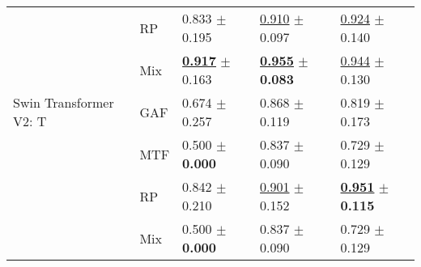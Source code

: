 \begin{tabular}{lllll}
 & RP & \textcolor[rgb]{0.2000000000,0.5000000000,0}{0.833} $\pm$ \textcolor[rgb]{0.7562290965,0.2437709035,0}{0.195} & \underline{\textcolor[rgb]{0.3607594937,0.5000000000,0}{0.910}} $\pm$ \textcolor[rgb]{0.1966386376,0.5000000000,0}{0.097} & \underline{\textcolor[rgb]{0.1250000000,0.5000000000,0}{0.924}} $\pm$ \textcolor[rgb]{0.3653589030,0.5000000000,0}{0.140} \\
 & Mix & \underline{\textbf{\textcolor[rgb]{0.0000000000,0.5000000000,0}{0.917}}} $\pm$ \textcolor[rgb]{0.6327066559,0.3672933441,0}{0.163} & \underline{\textbf{\textcolor[rgb]{0.0000000000,0.5000000000,0}{0.955}}} $\pm$ \textbf{\textcolor[rgb]{0.0000000000,0.5000000000,0}{0.083}} & \underline{\textcolor[rgb]{0.0312500000,0.5000000000,0}{0.944}} $\pm$ \textcolor[rgb]{0.2186313288,0.5000000000,0}{0.130} \\
Swin Transformer V2: T & GAF & \textcolor[rgb]{0.5833333333,0.4166666667,0}{0.674} $\pm$ \textcolor[rgb]{1.0000000000,0.0000000000,0}{0.257} & \textcolor[rgb]{0.6898734177,0.3101265823,0}{0.868} $\pm$ \textcolor[rgb]{0.5237268248,0.4762731752,0}{0.119} & \textcolor[rgb]{0.5937500000,0.4062500000,0}{0.819} $\pm$ \textcolor[rgb]{0.8629057551,0.1370942449,0}{0.173} \\
 & MTF & \textcolor[rgb]{1.0000000000,0.0000000000,0}{0.500} $\pm$ \textbf{\textcolor[rgb]{0.0000000000,0.5000000000,0}{0.000}} & \textcolor[rgb]{0.9367088608,0.0632911392,0}{0.837} $\pm$ \textcolor[rgb]{0.0948745076,0.5000000000,0}{0.090} & \textcolor[rgb]{1.0000000000,0.0000000000,0}{0.729} $\pm$ \textcolor[rgb]{0.2036354899,0.5000000000,0}{0.129} \\
 & RP & \textcolor[rgb]{0.1800000000,0.5000000000,0}{0.842} $\pm$ \textcolor[rgb]{0.8151855020,0.1848144980,0}{0.210} & \underline{\textcolor[rgb]{0.4272151899,0.5000000000,0}{0.901}} $\pm$ \textcolor[rgb]{1.0000000000,0.0000000000,0}{0.152} & \underline{\textbf{\textcolor[rgb]{0.0000000000,0.5000000000,0}{0.951}}} $\pm$ \textbf{\textcolor[rgb]{0.0000000000,0.5000000000,0}{0.115}} \\
 & Mix & \textcolor[rgb]{1.0000000000,0.0000000000,0}{0.500} $\pm$ \textbf{\textcolor[rgb]{0.0000000000,0.5000000000,0}{0.000}} & \textcolor[rgb]{0.9367088608,0.0632911392,0}{0.837} $\pm$ \textcolor[rgb]{0.0948745076,0.5000000000,0}{0.090} & \textcolor[rgb]{1.0000000000,0.0000000000,0}{0.729} $\pm$ \textcolor[rgb]{0.2036354899,0.5000000000,0}{0.129} \\
\bottomrule
\end{tabular}

